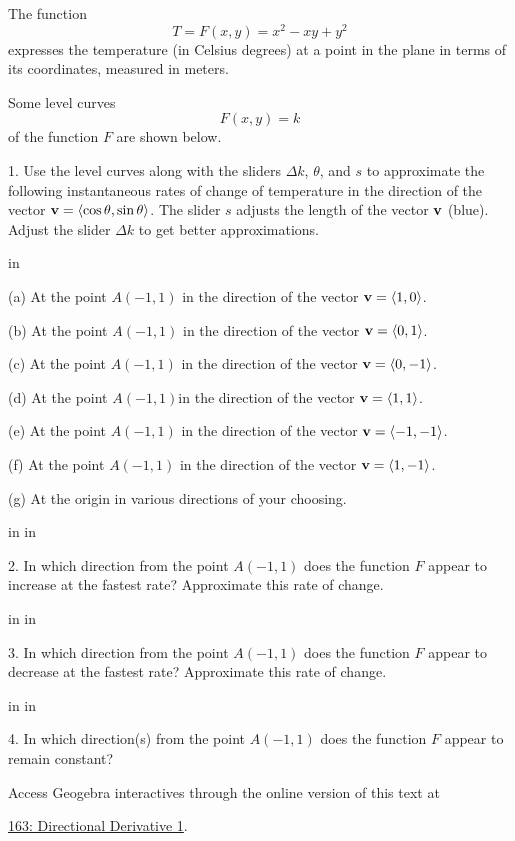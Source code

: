 \documentclass{ximera}
\newcommand{\pskip}{\vskip 0.1 in}
\begin{document}
\begin{question}  \label{Qds54546bd}

The function 
\[
     T= F(x,y) = x^2 -xy +y^2
\]
expresses the temperature (in Celsius degrees) at a point in the plane in terms of its coordinates, measured in meters.

Some level curves 
\[
     F(x,y)=k
\]
of the function $F$ are shown below. 

1. Use the level curves along with the sliders $\Delta k$, $\theta$, and $s$ to approximate the following instantaneous rates of change of temperature in the direction of the vector ${\bf v} = \langle \cos\theta, \sin\theta \rangle$. The slider $s$ adjusts the length of the vector ${\bf v}$ (blue). Adjust the slider $\Delta k$ to get better approximations.

\pskip

(a) At the point $A(-1,1)$ in the direction of the vector ${\bf v} = \langle 1, 0 \rangle$.

(b)  At the point $A(-1,1)$ in the direction of the vector ${\bf v} = \langle 0,1 \rangle$.

(c)  At the point $A(-1,1)$ in the direction of the vector ${\bf v} = \langle 0, -1 \rangle$.

(d)  At the point $A(-1,1)$in the direction of the vector ${\bf v} = \langle 1,1 \rangle$.

(e)  At the point $A(-1,1)$ in the direction of the vector ${\bf v} = \langle -1,-1 \rangle$.

(f)  At the point $A(-1,1)$ in the direction of the vector ${\bf v} = \langle 1,-1 \rangle$.

(g) At the origin in various directions of your choosing.

\pskip \pskip

2. In which direction from the point $A(-1,1)$ does the function $F$ appear to increase at the fastest rate? Approximate this rate of change.

\pskip \pskip

3. In which direction from the point $A(-1,1)$ does the function $F$ appear to decrease at the fastest rate? Approximate this rate of change.

\pskip \pskip

4. In which direction(s) from the point $A(-1,1)$ does the function $F$ appear to remain constant? 


 
\begin{onlineOnly}
    \begin{center}
\end{center}
\end{onlineOnly}

Access Geogebra interactives through the online version of this text at
 
\href{https://www.geogebra.org/classic/cfkfwfpk}{163: Directional Derivative 1}.



\end{question}
\end{document}
